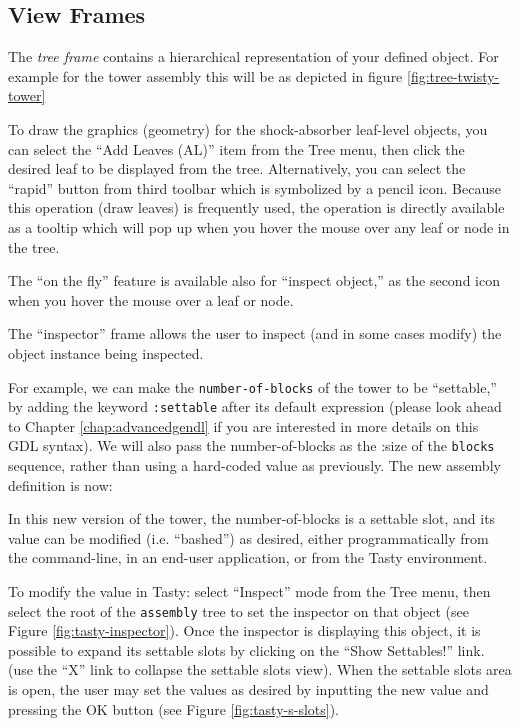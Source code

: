 \documentclass [11pt]{book}
\begin{document}
\subsection{View Frames}

\label{subsec:viewframes}



The \emph{tree frame} contains a hierarchical representation of your defined
object. For example for the tower assembly this will be as depicted in
figure 
\ref{fig:tree-twisty-tower}



To draw the graphics (geometry) for the shock-absorber
leaf-level objects, you can select the ``Add Leaves (AL)'' item from
the Tree menu, then click the desired leaf to be displayed from the
tree. Alternatively, you can select the ``rapid'' button from third
toolbar which is symbolized by a pencil icon. Because this
operation (draw leaves) is frequently used, the operation is directly
available as a tooltip which will pop up when you hover the mouse over
any leaf or node in the tree.



The ``on the fly'' feature is available also for ``inspect
object,'' as the second icon when you hover the mouse over a leaf or
node.



The ``inspector'' frame allows the user to inspect (and in
some cases modify) the object instance being inspected.



For example, we can make the \texttt{number-of-blocks} of the tower to be ``settable,'' by adding the keyword \texttt{:settable} after its default expression (please look ahead to Chapter 
\ref{chap:advancedgendl} if you are interested in more details on this  GDL
syntax). We will also pass the number-of-blocks as the :size of the  \texttt{blocks} sequence, rather than using a hard-coded value as
previously. The new assembly definition is now:



In this new version of the tower, the number-of-blocks is a
settable slot, and its value can be modified (i.e. ``bashed'') as
desired, either programmatically from the command-line, in an end-user
application, or from the Tasty environment.



To modify the value in Tasty: select ``Inspect'' mode from the Tree
menu, then select the root of the \texttt{assembly} tree to set the inspector on that object (see Figure 
\ref{fig:tasty-inspector}). Once the inspector is displaying this object, it is
possible to expand its settable slots by clicking on the ``Show
Settables!''  link. (use the ``X'' link to collapse the settable slots
view). When the settable slots area is open, the user may set the
values as desired by inputting the new value and pressing the OK
button (see Figure 
\ref{fig:tasty-s-slots}).
\end{document}
